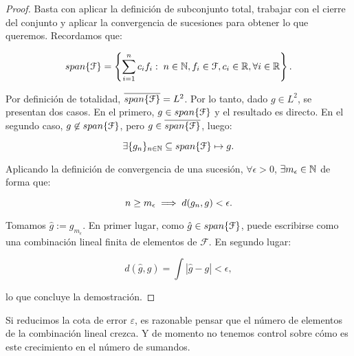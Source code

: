 \begin{proof}

    Basta con aplicar la definición de subconjunto total, trabajar con el cierre del conjunto y aplicar la convergencia de sucesiones para obtener lo que queremos. Recordamos que:

    \begin{equation}
        span\{ \mathcal{F} \} = \left \{ \sum_{i = 1}^n c_i f_i: \; n \in \mathbb{N}, f_i \in \mathcal{F}, c_i \in \mathbb{R}, \forall i \in \mathbb{R} \right\}.
    \end{equation}

    Por definición de totalidad, $\overline{span\{ \mathcal{F} \}} = L^2$. Por lo tanto, dado $g \in L^2$, se presentan dos casos. En el primero, $g \in span\{ \mathcal{F} \}$ y el resultado es directo. En el segundo caso, $g \not\in span\{ \mathcal{F} \}$, pero $g \in \overline{span\{ \mathcal{F} \}}$, luego:

    \begin{equation}
        \exists \{ g_n \}_{n \in \mathbb{N}} \subseteq span\{ \mathcal{F} \} \mapsto g.
    \end{equation}

    Aplicando la definición de convergencia de una sucesión, $\forall \epsilon > 0$, $\exists m_{\epsilon} \in \mathbb{N}$ de forma que:

    \begin{equation}
        n \geq m_{\epsilon} \implies d(g_n, g) < \epsilon.
    \end{equation}

    Tomamos $\hat{g} := g_{m_\epsilon}$. En primer lugar, como $\hat{g} \in span\{ \mathcal{F} \}$, puede escribirse como una combinación lineal finita de elementos de $\mathcal{F}$. En segundo lugar:

    \begin{equation}
        d(\hat{g}, g) = \int |\hat{g} - g| < \epsilon,
    \end{equation}

    lo que concluye la demostración.

\end{proof}

\begin{observacion}
    Si reducimos la cota de error $\varepsilon$, es razonable pensar que el número de elementos de la combinación lineal crezca. Y de momento no tenemos control sobre cómo es este crecimiento en el número de sumandos.
\end{observacion}

